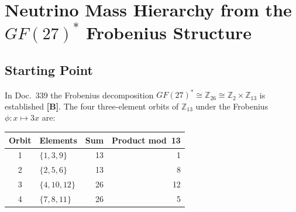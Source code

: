 
\providecommand{\BM}{\textbf{[B]}}
\providecommand{\KM}{\textbf{[K]}}
\providecommand{\SM}{\textbf{[S]}}
\providecommand{\LM}{\textbf{[L]}}
\providecommand{\SetzM}{\textbf{[SETZUNG]}}

\chapter*{Neutrino Mass Hierarchy from the $GF(27)^*$ Frobenius Structure}

\begin{abstract}
Starting from the Frobenius decomposition
$GF(27)^*\cong\mathbb{Z}_{26}\cong\mathbb{Z}_2\times\mathbb{Z}_{13}$
(Doc.~339), the measured neutrino mass differences $\Delta m^2_\text{atm}$
and $\Delta m^2_\text{sol}$ are derived from algebraic properties of the
four Frobenius orbits in $\mathbb{Z}_{13}$. The atmospheric mass difference
$\Delta m^2_\text{atm}=(11^2-1)m_\nu^2=120\,m_\nu^2$ (1.0\,\% deviation)
and the solar $\Delta m^2_\text{sol}=(|\mathbb{Z}_{13}|-2)/3\cdot
m_\nu^2=(11/3)m_\nu^2$ (0.46\,\% deviation) follow from the number~$11$,
the maximum element of the fourth Frobenius orbit $\{7,8,11\}$ in
$\mathbb{Z}_{13}$. Orbit~3 $\{4,10,12\}$ is algebraically self-inverse
and carries Majorana character. The coherent venting amplitude
$p_\text{vent}=5/24$ is proved algebraically from the branching rule
$\rho_4\!\downarrow_{A_4}=\rho_3^{A_4}\oplus\rho_1^{A_4}$ and the index
$|A_5:A_4|=5$. The SICC venting formula is equivalent to the standard
oscillation formula. Status: \BM\ for the group theory; \KM\ for the
mass differences.
\end{abstract}

\section{Starting Point}

In Doc.~339 the Frobenius decomposition
$GF(27)^*\cong\mathbb{Z}_{26}\cong\mathbb{Z}_2\times\mathbb{Z}_{13}$
is established \BM. The four three-element orbits of $\mathbb{Z}_{13}$
under the Frobenius $\phi:x\mapsto3x$ are:

\begin{center}
\begin{tabular}{clrr}
\toprule
Orbit & Elements & Sum & Product mod~13 \\
\midrule
1 & $\{1,3,9\}$   & 13 & 1  \\
2 & $\{2,5,6\}$   & 13 & 8  \\
3 & $\{4,10,12\}$ & 26 & 12 \\
4 & $\{7,8,11\}$  & 26 & 5  \\
\bottomrule
\end{tabular}
\end{center}

